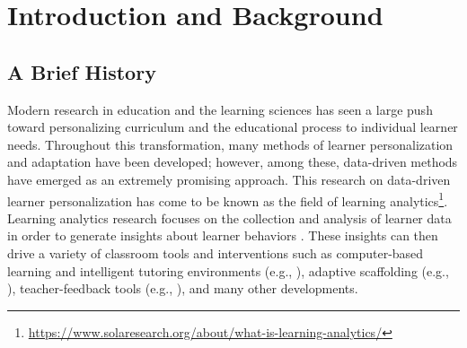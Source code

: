 \documentclass[manuscript,screen,review]{acmart}
\begin{document}


\maketitle


\section{Introduction and Background} \label{sec:intro_background}

\subsection{A Brief History}

Modern research in education and the learning sciences has seen a large push toward personalizing curriculum and the educational process to individual learner needs. Throughout this transformation, many methods of learner personalization and adaptation have been developed; however, among these, data-driven methods have emerged as an extremely promising approach. This research on data-driven learner personalization has come to be known as the field of learning analytics\footnote{\href{https://www.solaresearch.org/about/what-is-learning-analytics/}{https://www.solaresearch.org/about/what-is-learning-analytics/}}. Learning analytics research focuses on the collection and analysis of learner data in order to generate insights about learner behaviors \cite{maseleno2018demystifying, Zilvinskis2017}. These insights can then drive a variety of classroom tools and interventions such as computer-based learning and intelligent tutoring environments (e.g., \cite{heffernan2014assistments, leelawong2008designing}), adaptive scaffolding (e.g., \cite{Emerson2020, basu2017learner}), teacher-feedback tools (e.g., \cite{rodriguez2018teacher, Hutchins2023}), and many other developments. 
\end{document}
